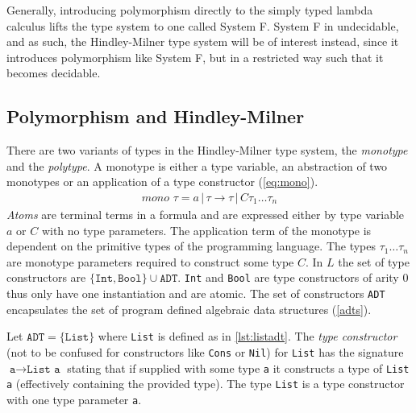 \documentclass[11pt,oneside,a4paper]{report}
\begin{document}
Generally, introducing polymorphism directly to the simply typed lambda calculus lifts the type system to one called System F.
System F in undecidable, and as such, the Hindley-Milner type system will be of interest instead, since it introduces polymorphism like System F, but in a restricted way such that it becomes decidable.


\subsection{Polymorphism and Hindley-Milner}
There are two variants of types in the Hindley-Milner type system, the \textit{monotype} and the \textit{polytype}.
A monotype is either a type variable, an abstraction of two monotypes or an application of a type constructor (\autoref{eq:mono}).
\begin{align}
	mono \,\,\tau = a \,|\, \tau \rightarrow \tau \,|\, C \tau_1 \dots \tau_n
	\label{eq:mono}
\end{align}
\textit{Atoms} are terminal terms in a formula and are expressed either by type variable $a$ or $C$ with no type parameters.
The application term of the monotype is dependent on the primitive types of the programming language.
The types $\tau_1 \dots \tau_n$ are monotype parameters required to construct some type $C$.
In $L$ the set of type constructors are $\{ \texttt{Int}, \texttt{Bool} \} \cup \texttt{ADT}$.
\texttt{Int} and \texttt{Bool} are type constructors of arity 0 thus only have one instantiation and are atomic.
The set of constructors \texttt{ADT} encapsulates the set of program defined algebraic data structures (\autoref{adts}).
\begin{exmp}
    Let $\texttt{ADT} = \{ \texttt{List} \}$ where \texttt{List} is defined as in \autoref{lst:listadt}.
    The \textit{type constructor} (not to be confused for constructors like \texttt{Cons} or \texttt{Nil}) for \texttt{List} has the signature $\texttt{a} \rightarrow \texttt{List a}$ stating that if supplied with some type \texttt{a} it constructs a type of \texttt{List a} (effectively containing the provided type).
    The type \texttt{List} is a type constructor with one type parameter \texttt{a}.
\end{exmp}
\end{document}
